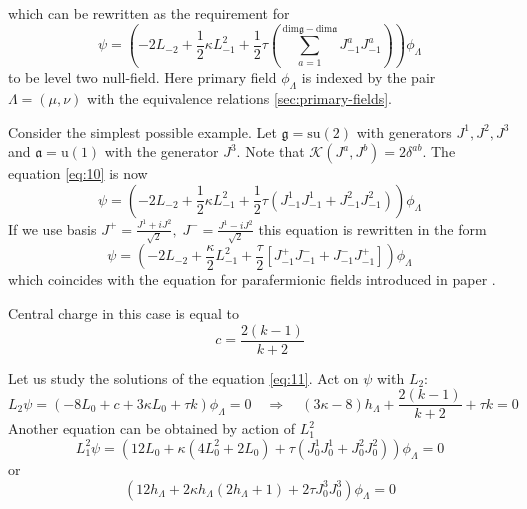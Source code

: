 \documentclass[12pt]{article}
\theoremstyle{definition}
\newcommand{\gf}{\mathfrak{g}}
\newcommand{\af}{\mathfrak{a}}
\theoremstyle{definition} \newtheorem{Def}{Definition}
\begin{document}
which can be rewritten as the requirement for
\begin{equation}
  \psi=\left(-2L_{-2}+\frac{1}{2}\kappa L_{-1}^{2}+\frac{1}{2}\tau \left(\sum_{a=1}^{\mathrm{dim}\gf-\mathrm{dim}\af}J^{a}_{-1}J^{a}_{-1}\right)\right) \phi_{\Lambda}
\label{eq:10}
\end{equation}
to be level two null-field. Here primary field $\phi_{\Lambda}$ is indexed by the pair $\Lambda=(\mu,\nu)$ with the equivalence relations \ref{sec:primary-fields}.

Consider the simplest possible example. Let $\gf=\mathrm{su}(2)$ with generators $J^{1},J^{2},J^{3}$ and $\af=\mathrm{u}(1)$ with the generator $J^{3}$. Note that $\mathcal{K}(J^{a},J^{b})=2\delta^{ab}$. The equation \eqref{eq:10} is now
\begin{equation}
  \label{eq:11}
  \psi=\left(-2L_{-2}+\frac{1}{2}\kappa L_{-1}^{2}+\frac{1}{2}\tau \left(J^{1}_{-1}J^{1}_{-1}+J^{2}_{-1}J^{2}_{-1}\right)\right) \phi_{\Lambda}
\end{equation}
If we use basis $J^{+}=\frac{J^{1}+iJ^{2}}{\sqrt{2}},\; J^{-}=\frac{J^{1}-iJ^{2}}{\sqrt{2}}$ this equation is rewritten in the form
\begin{equation}
 \psi= \left(-2 L_{-2}+\frac{\kappa}{2}L_{-1}^{2}+\frac{\tau}{2}\left[J^{+}_{-1}J^{-}_{-1}+J^{-}_{-1}J^{+}_{-1}\right]\right) \phi_{\Lambda}
\label{eq:12}
\end{equation}
which coincides with the equation for parafermionic fields introduced in paper \cite{santachiara2008sle}.

Central charge in this case is equal to
\begin{equation}
  \label{eq:14}
  c=\frac{2(k-1)}{k+2}
\end{equation}

Let us study the solutions of the equation \eqref{eq:11}. Act on $\psi$ with $L_{2}$:
\begin{equation}
  \label{eq:13}
  L_{2}\psi=(-8L_{0}+c+3\kappa L_{0}+\tau k)\phi_{\Lambda}=0\quad \Longrightarrow\quad  (3\kappa-8) h_{\Lambda}+\frac{2(k-1)}{k+2}+\tau k =0
\end{equation}
Another equation can be obtained by action of $L_{1}^{2}$
\begin{equation}
  \label{eq:15}
  L_{1}^{2}\psi = (12 L_{0} + \kappa(4 L_{0}^{2}+2 L_{0}) +\tau (J_{0}^{1}J_{0}^{1}+J_{0}^{2}J_{0}^{2}))\phi_{\Lambda}=0
\end{equation}
or
\begin{equation}
  \label{eq:16}
  \left(12 h_{\Lambda}+2\kappa h_{\Lambda} (2h_{\Lambda}+1) + 2 \tau J^{3}_{0}J^{3}_{0}\right) \phi_{\Lambda}=0
\end{equation}
\end{document}
